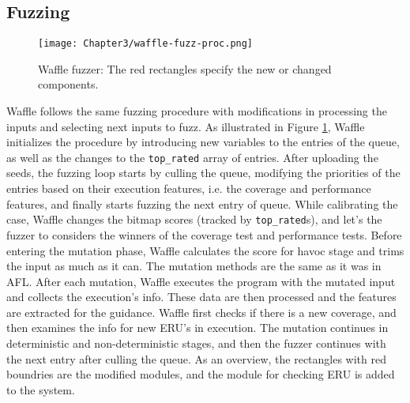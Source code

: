 \subsection{Fuzzing}



\begin{figure}[!b]
  \texttt{[image: Chapter3/waffle-fuzz-proc.png]}
  \centering
  \caption{Waffle fuzzer: The red rectangles specify the new or changed components.}
  \label{fig:waffle-fuzz-proc}
\end{figure}

Waffle follows the same fuzzing procedure with modifications in processing the inputs and selecting next inputs to fuzz. As illustrated in Figure \ref{fig:waffle-fuzz-proc}, Waffle initializes the procedure by introducing new variables to the entries of the queue, as well as the changes to the \texttt{top\_rated} array of entries. After uploading the seeds, the fuzzing loop starts by culling the queue, modifying the priorities of the entries based on their execution features, i.e. the coverage and performance features, and finally starts fuzzing the next entry of queue. While calibrating the case, Waffle changes the bitmap scores (tracked by \texttt{top\_rated}s), and let's the fuzzer to considers the winners of the coverage test and performance tests. Before entering the mutation phase, Waffle calculates the score for havoc stage and trims the input as much as it can. The mutation methods are the same as it was in AFL. After each mutation, Waffle executes the program with the mutated input and collects the execution's info. These data are then processed and the features are extracted for the guidance. Waffle first checks if there is a new coverage, and then examines the info for new ERU's in execution. The mutation continues in deterministic and non-deterministic stages, and then the fuzzer continues with the next entry after culling the queue. As an overview, the rectangles with red boundries are the modified modules, and the module for checking ERU is added to the system.


